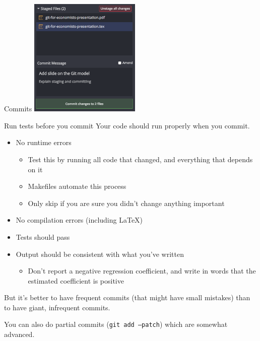 \documentclass{beamer}
\begin{document}
\begin{frame}{Commits}
\includegraphics[width=200px]{screenshots/committing.png}
\end{frame}

\begin{frame}{Run tests before you commit}
Your code should run properly when you commit.
\begin{itemize}
\item No runtime errors
\begin{itemize}
\item Test this by running all code that changed, and everything that depends on it
\item Makefiles automate this process
\item Only skip if you are sure you didn't change anything important
\end{itemize}
\item No compilation errors (including \LaTeX)
\item Tests should pass
\item Output should be consistent with what you've written
\begin{itemize}
\item Don't report a negative regression coefficient, and write in words that the estimated coefficient is positive
\end{itemize}
\end{itemize}
But it's better to have frequent commits (that might have small mistakes) than to have giant, infrequent commits.

{\tiny You can also do partial commits (\texttt{git add --patch}) which are somewhat advanced.}
\end{frame}
\end{document}
